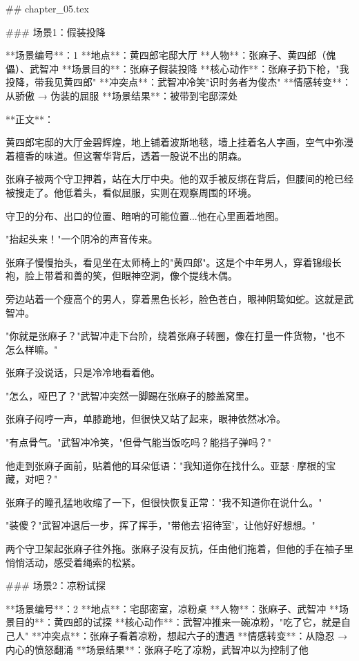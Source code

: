 ## chapter_05.tex

### 场景1：假装投降

**场景编号**：1  
**地点**：黄四郎宅邸大厅  
**人物**：张麻子、黄四郎（傀儡）、武智冲  
**场景目的**：张麻子假装投降  
**核心动作**：张麻子扔下枪，"我投降，带我见黄四郎"  
**冲突点**：武智冲冷笑"识时务者为俊杰"  
**情感转变**：从骄傲 → 伪装的屈服  
**场景结果**：被带到宅邸深处

**正文**：

黄四郎宅邸的大厅金碧辉煌，地上铺着波斯地毯，墙上挂着名人字画，空气中弥漫着檀香的味道。但这奢华背后，透着一股说不出的阴森。

张麻子被两个守卫押着，站在大厅中央。他的双手被反绑在背后，但腰间的枪已经被搜走了。他低着头，看似屈服，实则在观察周围的环境。

守卫的分布、出口的位置、暗哨的可能位置...他在心里画着地图。

"抬起头来！"一个阴冷的声音传来。

张麻子慢慢抬头，看见坐在太师椅上的"黄四郎"。这是个中年男人，穿着锦缎长袍，脸上带着和善的笑，但眼神空洞，像个提线木偶。

旁边站着一个瘦高个的男人，穿着黑色长衫，脸色苍白，眼神阴鸷如蛇。这就是武智冲。

"你就是张麻子？"武智冲走下台阶，绕着张麻子转圈，像在打量一件货物，"也不怎么样嘛。"

张麻子没说话，只是冷冷地看着他。

"怎么，哑巴了？"武智冲突然一脚踢在张麻子的膝盖窝里。

张麻子闷哼一声，单膝跪地，但很快又站了起来，眼神依然冰冷。

"有点骨气。"武智冲冷笑，"但骨气能当饭吃吗？能挡子弹吗？"

他走到张麻子面前，贴着他的耳朵低语："我知道你在找什么。亚瑟·摩根的宝藏，对吧？"

张麻子的瞳孔猛地收缩了一下，但很快恢复正常："我不知道你在说什么。"

"装傻？"武智冲退后一步，挥了挥手，"带他去'招待室'，让他好好想想。"

两个守卫架起张麻子往外拖。张麻子没有反抗，任由他们拖着，但他的手在袖子里悄悄活动，感受着绳索的松紧。

### 场景2：凉粉试探

**场景编号**：2  
**地点**：宅邸密室，凉粉桌  
**人物**：张麻子、武智冲  
**场景目的**：黄四郎的试探  
**核心动作**：武智冲推来一碗凉粉，"吃了它，就是自己人"  
**冲突点**：张麻子看着凉粉，想起六子的遭遇  
**情感转变**：从隐忍 → 内心的愤怒翻涌  
**场景结果**：张麻子吃了凉粉，武智冲以为控制了他


